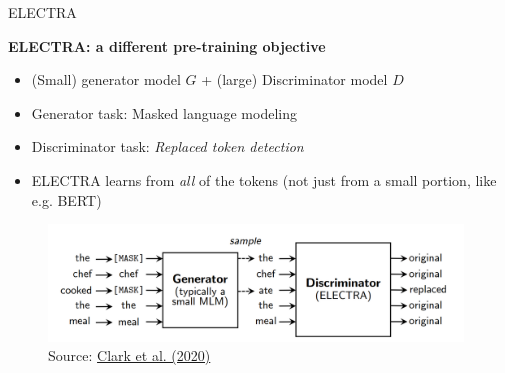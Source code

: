 \documentclass[]{beamer}
\begin{document}
\begin{frame}{ELECTRA \href{https://arxiv.org/pdf/2003.10555.pdf}{}}

	\textbf{ELECTRA: a different pre-training objective}

	\begin{itemize}
		\item (Small) generator model $G$ + (large) Discriminator model $D$
		\item Generator task: Masked language modeling
		\item Discriminator task: \textit{Replaced token detection}
		\item ELECTRA learns from \textit{all} of the tokens (not just from a small portion, like e.g. BERT)
	\end{itemize}
	
	\begin{figure}
		\centering
		\includegraphics[width = 11cm]{figure/electra.png}\\ 
		\footnotesize{Source:} \href{https://arxiv.org/pdf/2003.10555.pdf}{\footnotesize Clark et al. (2020)}
	\end{figure}
\end{frame}
\end{document}
